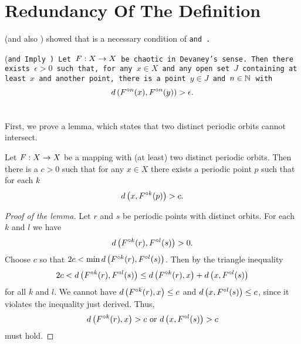 \documentclass[12pt,draft,twoside]{book}
\begin{document}

\section{Redundancy Of The Definition}
\citet{silverman} (and also \citet{banks}) showed that \sdic is a necessary condition of \tt and \dpp.
\begin{theorem}
  (\tt and \dpp Imply \sdic)
  Let $F: X\rightarrow X$ be chaotic in Devaney's sense.
  Then there exists $\epsilon > 0$ such that, for any $x\in X$ and any open set $J$ containing at least $x$ and another point, there is a point $y\in J$ and $n\in \mathbb{N}$ with
  \begin{equation*}
    d\left( F^{\circ n}(x),F^{\circ n}(y) \right) > \epsilon.
  \end{equation*}
  \label{thm:silverman}
\end{theorem}
First, we prove a lemma, which states that two distinct periodic orbits cannot intersect.
\begin{lemma}
  Let $F: X\rightarrow X$ be a mapping with (at least) two distinct periodic orbits.
  Then there is a $c > 0$ such that for any $x\in X$ there exists a periodic
  point $p$ such that for each $k$
  \begin{equation*}
    d\left( x, F^{\circ k}(p) \right) > c.
  \end{equation*}
  \label{lem:dev1}
  \begin{proof}[Proof of the lemma]
    Let $r$ and $s$ be periodic points with distinct orbits. For each $k$ and $l$ we have
    \begin{equation*}
      d\left( F^{\circ k}(r), F^{\circ l}(s) \right) > 0.
    \end{equation*}
    Choose $c$ so that $2c < \min d\left( F^{\circ k}(r),F^{\circ l}(s) \right)$.
    Then by the triangle inequality
    \begin{equation*}
      2c < d\left( F^{\circ k}(r),F^{\circ l}(s) \right) \leq d\left( F^{\circ k}(r),x \right) + d\left( x,F^{\circ l}(s) \right)
    \end{equation*}
    for all $k$ and $l$.
    We cannot have $d\left( F^{\circ k}(r),x \right) \leq c$ and $d\left( x,F^{\circ l}(s) \right) \leq c$, since it violates the inequality just derived.
    Thus,
    \begin{equation*}
      d\left( F^{\circ k}(r),x \right) > c \mbox{ or } d\left( x,F^{\circ l}(s) \right) > c
    \end{equation*}
    must hold.
  \end{proof}
\end{lemma}
\end{document}
